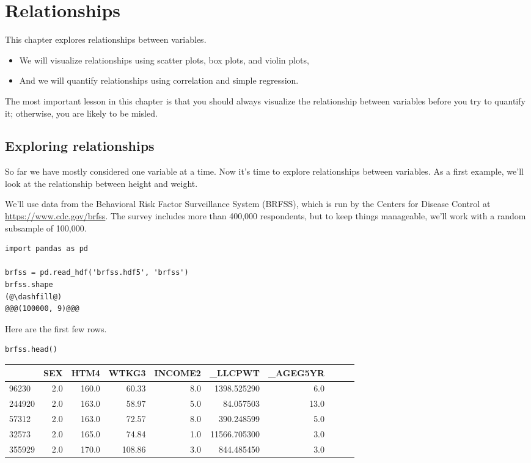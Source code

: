 \hypertarget{relationships}{%
\chapter{Relationships}\label{relationships}}

This chapter explores relationships between variables.

\begin{itemize}
\item
  We will visualize relationships using scatter plots, box plots, and
  violin plots,
\item
  And we will quantify relationships using correlation and simple
  regression.
\end{itemize}

The most important lesson in this chapter is that you should always
visualize the relationship between variables before you try to quantify
it; otherwise, you are likely to be misled.

\hypertarget{exploring-relationships}{%
\section{Exploring relationships}\label{exploring-relationships}}

So far we have mostly considered one variable at a time. Now it's time
to explore relationships between variables. As a first example, we'll
look at the relationship between height and weight.

We'll use data from the Behavioral Risk Factor Surveillance System
(BRFSS), which is run by the Centers for Disease Control at
\url{https://www.cdc.gov/brfss}. The survey includes more than 400,000
respondents, but to keep things manageable, we'll work with a random
subsample of 100,000.

\begin{lstlisting}[]
import pandas as pd

brfss = pd.read_hdf('brfss.hdf5', 'brfss')
brfss.shape
(@\dashfill@)
@@@(100000, 9)@@@
\end{lstlisting}

Here are the first few rows.

\begin{lstlisting}[]
brfss.head()
\end{lstlisting}

\begin{tabular}{lrrrrrrrrr}
\midrule
{} &  SEX &   HTM4 &   WTKG3 &  INCOME2 &       \_LLCPWT &  \_AGEG5YR  \\
\midrule
96230  &  2.0 &  160.0 &   60.33 &      8.0 &   1398.525290 &       6.0  \\
244920 &  2.0 &  163.0 &   58.97 &      5.0 &     84.057503 &      13.0  \\
57312  &  2.0 &  163.0 &   72.57 &      8.0 &    390.248599 &       5.0  \\
32573  &  2.0 &  165.0 &   74.84 &      1.0 &  11566.705300 &       3.0  \\
355929 &  2.0 &  170.0 &  108.86 &      3.0 &    844.485450 &       3.0  \\
\midrule
\end{tabular}

